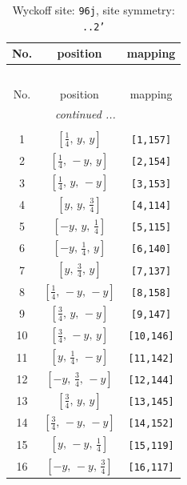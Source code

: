 \documentclass[fleqn,8pt]{jsarticle}
\begin{document}
\begin{longtable}{ccc}
\caption{Wyckoff site: {\tt 96j}, site symmetry: {\tt ..2'}}
 \\
 \hline \hline
No. & position & mapping \\ \hline \endfirsthead

\multicolumn{2}{l}{\tablename\ \thetable{}} \\
 \hline \hline
No. & position & mapping \\ \hline \endhead

 \hline \hline
\multicolumn{2}{r}{\footnotesize\it continued ...} \\ \endfoot

 \hline \hline
\multicolumn{2}{r}{} \\ \endlastfoot

1 & $\left[ \frac{1}{4},\, y,\, y \right]$ & {\tt [1,157]} \\ \hline
2 & $\left[ \frac{1}{4},\, - y,\, y \right]$ & {\tt [2,154]} \\ \hline
3 & $\left[ \frac{1}{4},\, y,\, - y \right]$ & {\tt [3,153]} \\ \hline
4 & $\left[ y,\, y,\, \frac{3}{4} \right]$ & {\tt [4,114]} \\ \hline
5 & $\left[ - y,\, y,\, \frac{1}{4} \right]$ & {\tt [5,115]} \\ \hline
6 & $\left[ - y,\, \frac{1}{4},\, y \right]$ & {\tt [6,140]} \\ \hline
7 & $\left[ y,\, \frac{3}{4},\, y \right]$ & {\tt [7,137]} \\ \hline
8 & $\left[ \frac{1}{4},\, - y,\, - y \right]$ & {\tt [8,158]} \\ \hline
9 & $\left[ \frac{3}{4},\, y,\, - y \right]$ & {\tt [9,147]} \\ \hline
10 & $\left[ \frac{3}{4},\, - y,\, y \right]$ & {\tt [10,146]} \\ \hline
11 & $\left[ y,\, \frac{1}{4},\, - y \right]$ & {\tt [11,142]} \\ \hline
12 & $\left[ - y,\, \frac{3}{4},\, - y \right]$ & {\tt [12,144]} \\ \hline
13 & $\left[ \frac{3}{4},\, y,\, y \right]$ & {\tt [13,145]} \\ \hline
14 & $\left[ \frac{3}{4},\, - y,\, - y \right]$ & {\tt [14,152]} \\ \hline
15 & $\left[ y,\, - y,\, \frac{1}{4} \right]$ & {\tt [15,119]} \\ \hline
16 & $\left[ - y,\, - y,\, \frac{3}{4} \right]$ & {\tt [16,117]} \\ \hline

\end{longtable}
\end{document}
